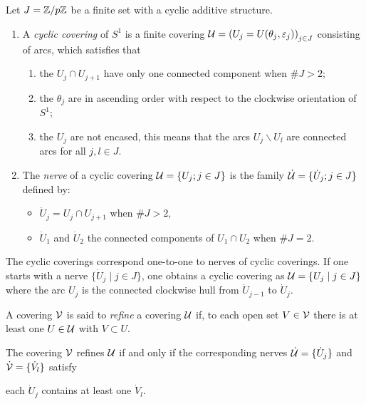 \begin{defn}
  \TODO[rewrite?]
  Let $J=\mathbb{Z}/p\mathbb{Z}$ be a finite set with a cyclic additive structure.
  \begin{enumerate}
    \item A \emph{cyclic covering} of $S^1$ is a finite covering
      $\mathcal{U}=\left(U_j=U(\theta_j,\varepsilon_j)\right)_{j\in J}$ consisting of
      arcs, which satisfies that
      \begin{enumerate}
        \item the $U_j\cap U_{j+1}$ have only one connected component when
          $\#J>2$;
        \item the $\theta_j$ are in ascending order with respect to the
          clockwise orientation of $S^1$;
        \item the $U_j$ are not encased, this means that the arcs
          $U_j\backslash U_l$ are connected arcs for all $j,l\in J$.
      \end{enumerate}
    \item The \emph{nerve} of a cyclic covering $\mathcal{U}=\{U_j;j\in J\}$ is the
      family $\dot{\mathcal{U}}=\{\dot U_j;j\in J\}$ defined by:
      \begin{itemize}
        \item $\dot U_j=U_j\cap U_{j+1}$ when $\#J>2$,
        \item $\dot U_1$ and $\dot U_2$ the connected components of
          $U_1\cap U_2$ when $\#J=2$.
      \end{itemize}
  \end{enumerate}
\end{defn}
The cyclic coverings correspond one-to-one to nerves of cyclic coverings. If
one starts with a nerve $\{\dot U_j \mid j\in J\}$, one obtains a cyclic
covering as $\mathcal{U}=\{U_j \mid j\in J\}$ where the arc $U_j$ is the connected
clockwise hull from $\dot U_{j-1}$ to $\dot U_j$.

\begin{defn}
  A covering $\mathcal{V}$ is said to \emph{refine} a covering $\mathcal{U}$ if, to each open
  set $V\in\mathcal{V}$ there is at least one $U\in\mathcal{U}$ with $V\subset U$.
\end{defn}
\begin{prop}
  The covering $\mathcal{V}$ refines $\mathcal{U}$ if and only if the corresponding nerves
  $\dot{\mathcal{U}}=\{\dot U_j\}$ and $\dot{\mathcal{V}}=\{\dot V_l\}$ satisfy
  \begin{einr}
    each $\dot U_j$ contains at least one $\dot V_l$.
  \end{einr}
\end{prop}

